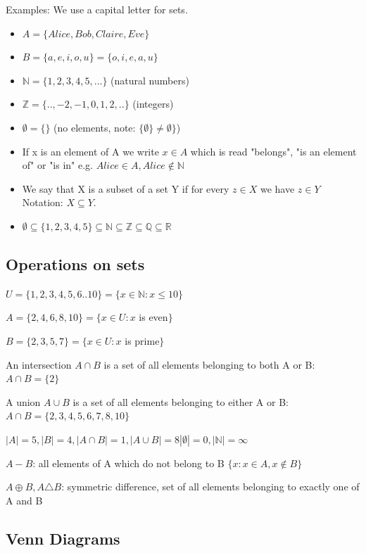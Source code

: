 \documentclass[9pt, letterpaper, oneside]{article}
\begin{document}
Examples: We use a capital letter for sets.
\begin{itemize}
	\item $A = \{ Alice, Bob, Claire, Eve \}$
	\item $B = \{ a, e, i, o, u \} = \{ o, i, e, a, u\}$
	\item $\mathbb{N} = \{1, 2, 3, 4, 5, ...\}$ (natural numbers)
	\item $\mathbb{Z} = \{.., -2, -1, 0, 1, 2, ..\}$ (integers)
	\item $\emptyset = \{\} $ (no elements, note: $\{\emptyset \} \neq \emptyset \}$)
	\item If x is an element of A we write $x \in A$ which is read "belongs", "is an element of" or "is in" e.g. $Alice \in A, Alice \notin \mathbb{N}$
	\item We say that X is a subset of a set Y if for every $z \in X$ we have $z \in Y$ Notation: $X \subseteq Y$.
	\item $\emptyset \subseteq \{1,2,3,4,5\} \subseteq \mathbb{N} \subseteq \mathbb{Z} \subseteq \mathbb{Q} \subseteq \mathbb{R} $
\end{itemize}

\subsection{Operations on sets}

$U = \{1,2,3,4,5,6 .. 10\} = \{ x \in \mathbb{N}: x \leq 10\}$

$A = \{2,4,6,8,10\} = \{x \in U: x $ is even$ \}$

$B = \{2,3,5,7\} = \{x \in U: x $ is prime$ \}$

An intersection $A \cap B$ is a set of all elements belonging to both A or B: $A \cap B = \{2\}$

A union $A \cup B$ is a set of all elements belonging to either A or B: $A \cap B = \{2,3,4,5,6,7,8,10\}$

$|A| = 5, |B| = 4, |A \cap B| = 1, |A \cup B| = 8 |\emptyset| = 0, |\mathbb{N}| = \infty$

$A - B$: all elements of A which do not belong to B $\{x : x \in A, x \notin B\}$

$A \oplus B, A \triangle B$: symmetric difference, set of all elements belonging to exactly one of A and B

\subsection{Venn Diagrams}
\end{document}
